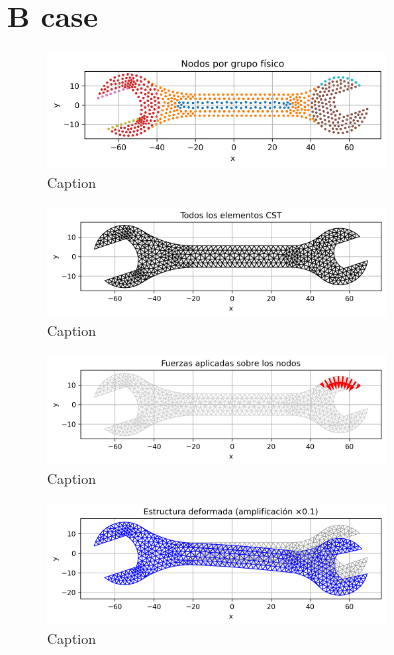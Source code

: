 \documentclass{article}  %
\begin{document}
\section{B case}

\begin{figure}[H]
  \centering
  \includegraphics[width=0.8\textwidth]{GRAFICOS/Case b_nodes_por_grupo.png}
  \caption{Caption}
  \label{fig:wrench}
\end{figure}

\begin{figure}[H]
  \centering
  \includegraphics[width=0.8\textwidth]{GRAFICOS/Case b_elementos.png}
  \caption{Caption}
  \label{fig:deformed_shape}
\end{figure}

\begin{figure}[H]
  \centering
  \includegraphics[width=0.8\textwidth]{GRAFICOS/Case b_fuerzas.png}
  \caption{Caption}
  \label{fig:strain}
\end{figure}

\begin{figure}[H]
  \centering
  \includegraphics[width=0.8\textwidth]{GRAFICOS/Case b_deformada.png}
  \caption{Caption}
  \label{fig:stress}
\end{figure}
\end{document}
